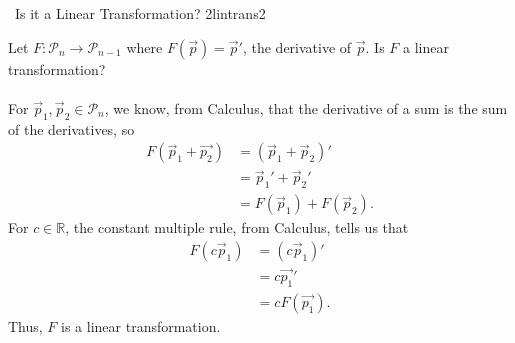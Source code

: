         \begin{example}{\Difficulty\,\Difficulty\,\,Is it a Linear Transformation? 2}{lintrans2}

            Let \(F:\mathcal{P}_n\to\mathcal{P}_{n-1}\) where \(F(\vec{p})=\vec{p}'\), the derivative of \(\vec{p}\). Is \(F\) a linear transformation?
            \\
            \\
            For \(\vec{p}_1,\vec{p}_2\in \mathcal{P}_n\), we know, from Calculus, that the derivative of a sum is the sum of the derivatives, so
            \begin{align*}
                F(\vec{p}_1+\vec{p_2})&=(\vec{p}_1+\vec{p}_2)' \\
                &=\vec{p}_1'+\vec{p}_2' \\
                &=F(\vec{p}_1)+F(\vec{p}_2).
            \end{align*}
            For \(c\in\mathbb{R}\), the constant multiple rule, from Calculus, tells us that
            \begin{align*}
                F(c\vec{p}_1)&=(c\vec{p}_1)' \\
                &=c\vec{p_1}' \\
                &=cF(\vec{p_1}).
            \end{align*}
            Thus, \(F\) is a linear transformation.
        \end{example}
        \pagebreak

